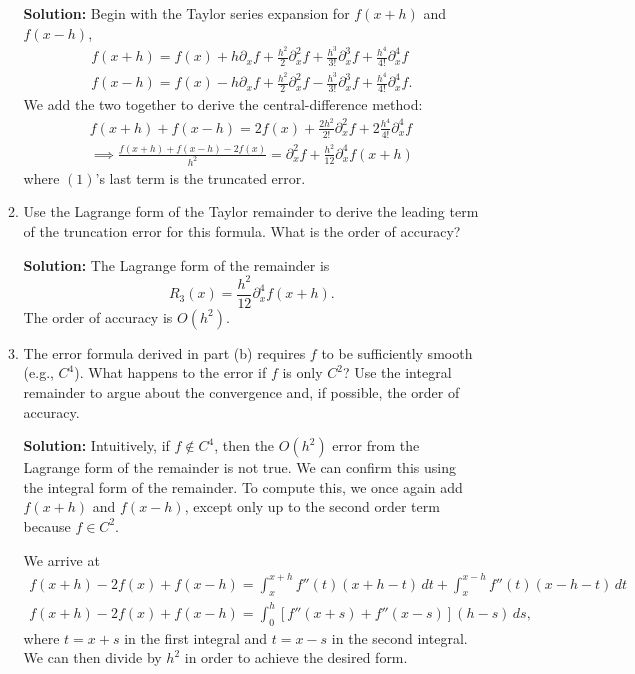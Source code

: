 \documentclass{article}
\theoremstyle{definition}
\theoremstyle{remark}
\begin{document}
\begin{enumerate}
\begin{enumerate}
        \textbf{Solution:} Begin with the Taylor series expansion for \(f(x+h)\) and \(f(x-h)\),
        \begin{gather*}
            f(x+h) = f(x) + h\partial_{x}f + \frac{h^{2}}{2}\partial_{x}^{2}f + \frac{h^{3}}{3!}\partial_{x}^{3}f + \frac{h^{4}}{4!}\partial_{x}^{4}f \\ 
            f(x-h) = f(x) - h\partial_{x}f + \frac{h^{2}}{2}\partial_{x}^{2}f - \frac{h^{3}}{3!}\partial_{x}^{3}f + \frac{h^{4}}{4!}\partial_{x}^{4}f.            
        \end{gather*}
        We add the two together to derive the central-difference method:
        \begin{gather*}
            f(x+h)+f(x-h) = 2f(x) + \frac{2h^{2}}{2!} \partial_{x}^{2}f + 2\frac{h^{4}}{4!}\partial_{x}^{4}f\\
            \implies \frac{f(x+h)+f(x-h)-2f(x)}{h^{2}} = \partial_{x}^{2}f + \frac{h^{2}}{12}\partial_{x}^{4}f(x+h) \tag{1}
        \end{gather*}
        where \((1)\)'s last term is the truncated error.\\
        
    
        \item Use the Lagrange form of the Taylor remainder to derive the leading term of the truncation error for this formula. What is the order of accuracy?

        \textbf{Solution:} The Lagrange form of the remainder is
        \[
            R_{3}(x) = \frac{h^{2}}{12} \displaystyle{\partial}_{x}^{4}f(x+h)
        .\]
        The order of accuracy is \(O(h^{2})\).\\
    
        \item The error formula derived in part (b) requires $f$ to be sufficiently smooth (e.g., $C^4$). What happens to the error if $f$ is only $C^2$? Use the integral remainder to argue about the convergence and, if possible, the order of accuracy.

        \textbf{Solution:} Intuitively, if \(f\not\in C^{4}\), then the \(O(h^{2})\) error from the Lagrange form of the remainder is not true. We can confirm this using the integral form of the remainder. To compute this, we once again add \(f(x+h)\) and \(f(x-h)\), except only up to the second order term because \(f\in C^{2}\).

        We arrive at 
        \begin{gather*}
            f(x+h) - 2f(x) + f(x-h) = \int_x^{x+h} f''(t)(x+h-t) \, dt + \int_x^{x-h} f''(t)(x-h-t) \, dt\\
            f(x+h) - 2f(x) + f(x-h) = \int_0^h [f''(x+s) + f''(x-s)](h-s) \, ds
        ,\end{gather*}
        where \(t=x+s\) in the first integral and \(t=x-s\) in the second integral. We can then divide by \(h^{2}\) in order to achieve the desired form.
        

\end{enumerate}
\end{enumerate}
\end{document}
